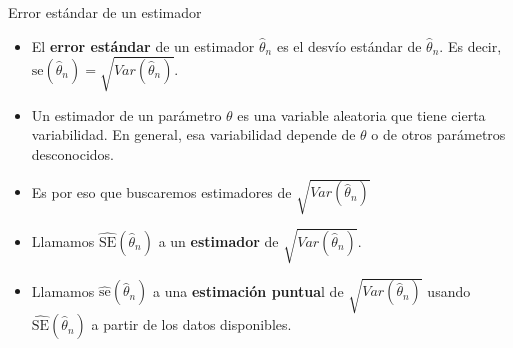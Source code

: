 \documentclass{beamer}
\theoremstyle{definition}
\begin{document}
\begin{frame}{\color{rosee}Error est\'andar de un estimador}\small
  \begin{itemize}
      \item  El \textbf{error est\'andar} de un estimador $\widehat{\theta}_n$
    es el desv\'io est\'andar de $\widehat{\theta}_n$. Es decir, $\text{se}(\widehat{\theta}_n)=
    \sqrt{Var(\widehat{\theta}_n)}$.
  
 \item Un estimador de un parámetro $\theta$ es una variable aleatoria que tiene cierta variabilidad. En general, esa variabilidad depende de $\theta$ o de otros parámetros desconocidos.
 
 \item Es por eso que buscaremos estimadores de $
    \sqrt{Var(\widehat{\theta}_n)}$
      \item Llamamos $\widehat{\text{SE}}(\widehat{\theta}_n)$ a un \textbf{estimador} de $\sqrt{Var(\widehat{\theta}_n)}$.
      
      \item Llamamos  $\widehat{\text{se}}(\widehat{\theta}_n)$ a una \textbf{estimación puntua}l de $\sqrt{Var(\widehat{\theta}_n)}$ usando $\widehat{\text{SE}}(\widehat{\theta}_n)$ a partir de los datos disponibles. 
          \end{itemize}
  
\end{frame}
\end{document}
